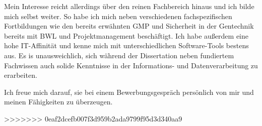 Mein Interesse reicht allerdings über den reinen Fachbereich hinaus und ich bilde mich selbst weiter. So habe ich mich neben verschiedenen fachspezifischen Fortbildungen wie den bereits erwähnten GMP und Sicherheit in der Gentechnik bereits mit BWL und Projektmanagement beschäftigt. Ich habe außerdem eine hohe IT-Affinität und kenne mich mit unterschiedlichen Software-Tools bestens aus. Es is unausweichlich, sich während der Dissertation neben fundiertem Fachwissen auch solide Kenntnisse in der Informations- und Datenverarbeitung zu erarbeiten.\par %

Ich freue mich darauf, sie bei einem Bewerbungsgespräch persönlich von mir und meinen Fähigkeiten zu überzeugen.\par\vspace{1em}




\makeletterclosing



>>>>>>> 0eaf2dcefb007f3d959b2ada9799f95d3d340aa9
